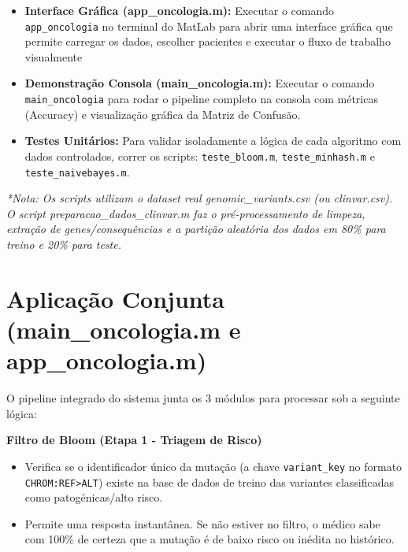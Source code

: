 \documentclass[11pt,a4paper]{article}
\begin{document}
\begin{itemize}
    \item \textbf{Interface Gráfica (app\_oncologia.m):} Executar o comando \texttt{app\_oncologia} no terminal do MatLab para abrir uma interface gráfica que permite carregar os dados, escolher pacientes e executar o fluxo de trabalho visualmente
    \item \textbf{Demonstração Consola (main\_oncologia.m):} Executar o comando \texttt{main\_oncologia} para rodar o pipeline completo na consola com métricas (Accuracy) e visualização gráfica da Matriz de Confusão.
    \item \textbf{Testes Unitários:} Para validar isoladamente a lógica de cada algoritmo com dados controlados, correr os scripts: \texttt{teste\_bloom.m}, \texttt{teste\_minhash.m} e \texttt{teste\_naivebayes.m}.
\end{itemize}

\textit{*Nota: Os scripts utilizam o dataset real genomic\_variants.csv (ou clinvar.csv). O script preparacao\_dados\_clinvar.m faz o pré-processamento de limpeza, extração de genes/consequências e a partição aleatória dos dados em 80\% para treino e 20\% para teste.}

\section*{Aplicação Conjunta (main\_oncologia.m e app\_oncologia.m)}
O pipeline integrado do sistema junta os 3 módulos para processar sob a seguinte lógica:

\vspace{0.5cm}
\noindent\textbf{Filtro de Bloom (Etapa 1 - Triagem de Risco)}
\begin{itemize}
    \item Verifica se o identificador único da mutação (a chave \texttt{variant\_key} no formato \texttt{CHROM:REF>ALT}) existe na base de dados de treino das variantes classificadas como patogénicas/alto risco.
    \item Permite uma resposta instantânea. Se não estiver no filtro, o médico sabe com 100\% de certeza que a mutação é de baixo risco ou inédita no histórico.
\end{itemize}
\end{document}
